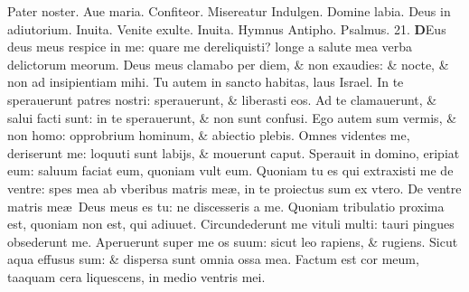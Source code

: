 \documentclass[a5paper,10pt]{book}
\def\ae{æ}
\begin{document}
\begin{multicols*}{2}
\vspace{-1em}
\par \noindent \color{red} P\color{black}ater noster. Aue maria. Confiteor. Misereatur Indulgen. Domine labia. Deus in adiutorium. \color{red} Inuita. \color{black} Venite exulte. \color{red} Inuita. Hymnus Antipho. Psalmus. 21. \color{black}
\lettrine[lines=2]{\bfseries \color{red} D}{}Eus deus meus respice in me: quare me dereliquisti? longe a salute mea verba delictorum meorum.
\newline \color{red} D\color{black}eus meus clamabo per diem, \& non exaudies: \& nocte, \& non ad insipientiam mihi.
\newline \color{red} T\color{black}u autem in sancto habitas, laus Israel.
\newline \color{red} I\color{black}n te sperauerunt patres nostri: sperauerunt, \& liberasti eos.
\newline \color{red} A\color{black}d te clamauerunt, \& salui facti sunt: in te sperauerunt, \& non sunt confusi.
\newline \color{red} E\color{black}go autem sum vermis, \& non homo: opprobrium hominum, \& abiectio plebis.
\newline \color{red} O\color{black}mnes videntes me, deriserunt me: loquuti sunt labijs, \& mouerunt caput.
\newline \color{red} S\color{black}perauit in domino, eripiat eum: saluum faciat eum, quoniam vult eum.
\newline \color{red} Q\color{black}uoniam tu es qui extraxisti me de ventre: spes mea ab vberibus matris me\ae , in te proiectus sum ex vtero.
\newline \color{red} D\color{black}e ventre matris me\ae \ Deus meus es tu: ne discesseris a me.
\newline \color{red} Q\color{black}uoniam tribulatio proxima est, quoniam non est, qui adiuuet.
\newline \color{red} C\color{black}ircundederunt me vituli multi: tauri pingues obsederunt me.
\newline \color{red} A\color{black}peruerunt super me os suum: sicut leo rapiens, \& rugiens.
\newline \color{red} S\color{black}icut aqua effusus sum: \& dispersa sunt omnia ossa mea.
\newline \color{red} F\color{black}actum est cor meum, taaquam cera liquescens, in medio ventris mei.

\end{multicols*}
\end{document}
